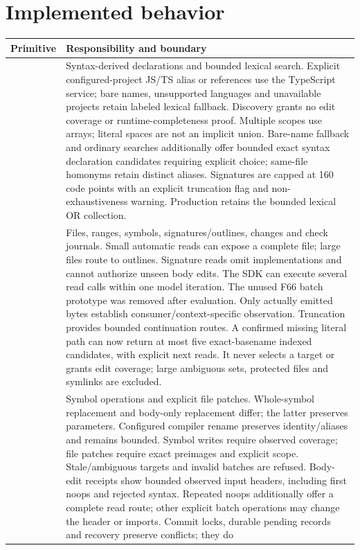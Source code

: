 \documentclass[11pt,a4paper]{article}
\newcommand{\code}[1]{\texttt{\detokenize{#1}}}
\begin{document}
\section{Implemented behavior}
\begin{longtable}{@{}p{.18\linewidth}p{.75\linewidth}@{}}
\toprule Primitive & Responsibility and boundary \\\midrule\endhead
\code{search_code} & Syntax-derived declarations and bounded lexical search.
Explicit configured-project JS/TS alias or \code{path#qualifiedName} references
use the TypeScript service; bare names, unsupported languages and unavailable
projects retain labeled lexical fallback. Discovery grants no edit coverage or
runtime-completeness proof. Multiple scopes use arrays; literal spaces are not
an implicit union. Bare-name fallback and ordinary searches additionally offer bounded exact syntax
declaration candidates requiring explicit choice; same-file homonyms retain
distinct aliases. Signatures are capped at 160 code points with an explicit
truncation flag and non-exhaustiveness warning. Production retains the bounded lexical OR collection. \\
\code{read_code} & Files, ranges, symbols, signatures/outlines, changes and check
journals. Small automatic reads can expose a complete file; large files route
to outlines. Signature reads omit implementations and cannot authorize unseen
body edits. The SDK can execute several read calls within one model iteration.
The unused F66 batch prototype was removed after evaluation.
Only actually emitted bytes establish consumer/context-specific
observation. Truncation provides bounded continuation routes. A confirmed missing
literal path can now return at most five exact-basename indexed candidates,
with explicit next reads. It never selects a target or grants edit coverage;
large ambiguous sets, protected files and symlinks are excluded. \\
\code{edit_code} & Symbol operations and explicit file patches. Whole-symbol
replacement and body-only replacement differ; the latter preserves parameters.
Configured compiler rename preserves identity/aliases and remains bounded.
Symbol writes require observed coverage; file patches require exact preimages
and explicit scope. Stale/ambiguous targets and invalid batches are refused.
Body-edit receipts show bounded observed input headers, including first noops
and rejected syntax. Repeated noops additionally offer a complete read route;
other explicit batch operations may change the header or imports.
Commit locks, durable pending records and recovery preserve conflicts; they do

\end{longtable}
\end{document}
